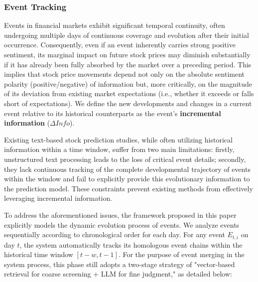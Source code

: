 \documentclass[sigconf, nonacm]{acmart} %
\begin{document}
\subsubsection{Event Tracking}
Events in financial markets exhibit significant temporal continuity, often undergoing multiple days of continuous coverage and evolution after their initial occurrence. 
Consequently, even if an event inherently carries strong positive sentiment, its marginal impact on future stock prices may diminish substantially if it has already been fully absorbed by the market over a preceding period. This implies that stock price movements depend not only on the absolute sentiment polarity (positive/negative) of information but, more critically, on the magnitude of its deviation from existing market expectations (i.e., whether it exceeds or falls short of expectations). 
We define the new developments and changes in a current event relative to its historical counterparts as the event's \textbf{incremental information} ($\Delta Info$).

Existing text-based stock prediction studies, while often utilizing historical information within a time window, suffer from two main limitations: firstly, unstructured text processing leads to the loss of critical event details; secondly, they lack continuous tracking of the complete developmental trajectory of events within the window and fail to explicitly provide this evolutionary information to the prediction model. These constraints prevent existing methods from effectively leveraging incremental information.

To address the aforementioned issues, the framework proposed in this paper explicitly models the dynamic evolution process of events. We analyze events sequentially according to chronological order for each day. For any event $E_{t,i}$ on day $t$, the system automatically tracks its homologous event chains within the historical time window $[t-w, t-1]$. For the purpose of event merging in the system process, this phase still adopts a two-stage strategy of "vector-based retrieval for coarse screening + LLM for fine judgment," as detailed below:
\end{document}
